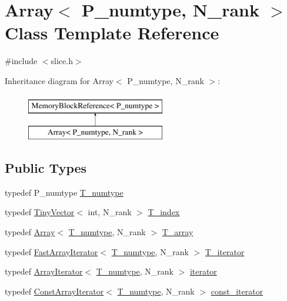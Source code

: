 \hypertarget{classArray}{}\section{Array$<$ P\+\_\+numtype, N\+\_\+rank $>$ Class Template Reference}
\label{classArray}


{\ttfamily \#include $<$slice.\+h$>$}

Inheritance diagram for Array$<$ P\+\_\+numtype, N\+\_\+rank $>$\+:\begin{figure}[H]
\begin{center}
\leavevmode
\includegraphics[height=2.000000cm]{classArray}
\end{center}
\end{figure}
\subsection*{Public Types}
\begin{DoxyCompactItemize}
\item 
typedef P\+\_\+numtype \hyperlink{classArray_ae72770f4a1d2f8b7193badafc320f008}{T\+\_\+numtype}
\item 
typedef \hyperlink{classTinyVector}{Tiny\+Vector}$<$ int, N\+\_\+rank $>$ \hyperlink{classArray_af3e455aedb140b84cee777ecdf2e846e}{T\+\_\+index}
\item 
typedef \hyperlink{classArray}{Array}$<$ \hyperlink{classArray_ae72770f4a1d2f8b7193badafc320f008}{T\+\_\+numtype}, N\+\_\+rank $>$ \hyperlink{classArray_a6a3d9b6a214107a10df219091801f1e0}{T\+\_\+array}
\item 
typedef \hyperlink{classFastArrayIterator}{Fast\+Array\+Iterator}$<$ \hyperlink{classArray_ae72770f4a1d2f8b7193badafc320f008}{T\+\_\+numtype}, N\+\_\+rank $>$ \hyperlink{classArray_a6975ccd49584b470e7b952b8acd598f0}{T\+\_\+iterator}
\item 
typedef \hyperlink{classArrayIterator}{Array\+Iterator}$<$ \hyperlink{classArray_ae72770f4a1d2f8b7193badafc320f008}{T\+\_\+numtype}, N\+\_\+rank $>$ \hyperlink{classArray_a3c33a296e6b0d7290b3f2221660f70f1}{iterator}
\item 
typedef \hyperlink{classConstArrayIterator}{Const\+Array\+Iterator}$<$ \hyperlink{classArray_ae72770f4a1d2f8b7193badafc320f008}{T\+\_\+numtype}, N\+\_\+rank $>$ \hyperlink{classArray_ad00ebe258c5672331aad96dc6d7299ab}{const\+\_\+iterator}
\end{DoxyCompactItemize}
